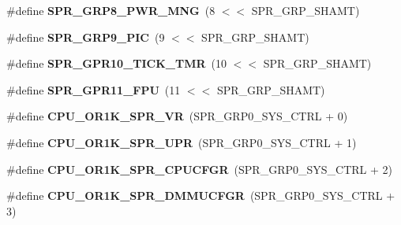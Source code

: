 \begin{DoxyCompactItemize}
\item 
\mbox{\label{or1k-utility_8h_a051963a693e63473b4cf272a74b9867f}} 
\#define {\bfseries S\+P\+R\+\_\+\+G\+R\+P8\+\_\+\+P\+W\+R\+\_\+\+M\+NG}~(8  $<$$<$ S\+P\+R\+\_\+\+G\+R\+P\+\_\+\+S\+H\+A\+MT)
\item 
\mbox{\label{or1k-utility_8h_a31f22bf3008043429e87c6550c94adca}} 
\#define {\bfseries S\+P\+R\+\_\+\+G\+R\+P9\+\_\+\+P\+IC}~(9  $<$$<$ S\+P\+R\+\_\+\+G\+R\+P\+\_\+\+S\+H\+A\+MT)
\item 
\mbox{\label{or1k-utility_8h_a1d3a8e86d94c33d0e1a3225803d89d42}} 
\#define {\bfseries S\+P\+R\+\_\+\+G\+P\+R10\+\_\+\+T\+I\+C\+K\+\_\+\+T\+MR}~(10 $<$$<$ S\+P\+R\+\_\+\+G\+R\+P\+\_\+\+S\+H\+A\+MT)
\item 
\mbox{\label{or1k-utility_8h_a6ea0767849647d3789c2fbfc16605000}} 
\#define {\bfseries S\+P\+R\+\_\+\+G\+P\+R11\+\_\+\+F\+PU}~(11 $<$$<$ S\+P\+R\+\_\+\+G\+R\+P\+\_\+\+S\+H\+A\+MT)
\item 
\mbox{\label{or1k-utility_8h_afa414e2a214175ef2f5acd87949f6c52}} 
\#define {\bfseries C\+P\+U\+\_\+\+O\+R1\+K\+\_\+\+S\+P\+R\+\_\+\+VR}~(S\+P\+R\+\_\+\+G\+R\+P0\+\_\+\+S\+Y\+S\+\_\+\+C\+T\+RL + 0)
\item 
\mbox{\label{or1k-utility_8h_a181669e71c5b2f76efb626e127a0f4dc}} 
\#define {\bfseries C\+P\+U\+\_\+\+O\+R1\+K\+\_\+\+S\+P\+R\+\_\+\+U\+PR}~(S\+P\+R\+\_\+\+G\+R\+P0\+\_\+\+S\+Y\+S\+\_\+\+C\+T\+RL + 1)
\item 
\mbox{\label{or1k-utility_8h_aa4a876eb86b19ca957eec92c51865a33}} 
\#define {\bfseries C\+P\+U\+\_\+\+O\+R1\+K\+\_\+\+S\+P\+R\+\_\+\+C\+P\+U\+C\+F\+GR}~(S\+P\+R\+\_\+\+G\+R\+P0\+\_\+\+S\+Y\+S\+\_\+\+C\+T\+RL + 2)
\item 
\mbox{\label{or1k-utility_8h_a7d9d12b9cff38f7899728a31e77557c9}} 
\#define {\bfseries C\+P\+U\+\_\+\+O\+R1\+K\+\_\+\+S\+P\+R\+\_\+\+D\+M\+M\+U\+C\+F\+GR}~(S\+P\+R\+\_\+\+G\+R\+P0\+\_\+\+S\+Y\+S\+\_\+\+C\+T\+RL + 3)
\item 
\mbox{\label{or1k-utility_8h_a11942b4103e5b2c5ff521e3c107aee19}} 

\end{DoxyCompactItemize}
